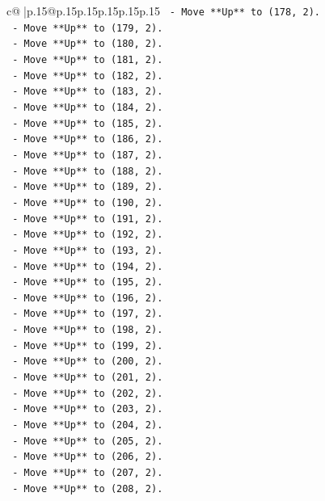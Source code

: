 \documentclass{article}
\begin{document}
{\begin{supertabular}{c@{$\;$}|p{.15\linewidth}@{}p{.15\linewidth}p{.15\linewidth}p{.15\linewidth}p{.15\linewidth}p{.15\linewidth}}
{{{\texttt{    {-} Move **Up** to (178, 2).} \\
\texttt{    {-} Move **Up** to (179, 2).} \\
\texttt{    {-} Move **Up** to (180, 2).} \\
\texttt{    {-} Move **Up** to (181, 2).} \\
\texttt{    {-} Move **Up** to (182, 2).} \\
\texttt{    {-} Move **Up** to (183, 2).} \\
\texttt{    {-} Move **Up** to (184, 2).} \\
\texttt{    {-} Move **Up** to (185, 2).} \\
\texttt{    {-} Move **Up** to (186, 2).} \\
\texttt{    {-} Move **Up** to (187, 2).} \\
\texttt{    {-} Move **Up** to (188, 2).} \\
\texttt{    {-} Move **Up** to (189, 2).} \\
\texttt{    {-} Move **Up** to (190, 2).} \\
\texttt{    {-} Move **Up** to (191, 2).} \\
\texttt{    {-} Move **Up** to (192, 2).} \\
\texttt{    {-} Move **Up** to (193, 2).} \\
\texttt{    {-} Move **Up** to (194, 2).} \\
\texttt{    {-} Move **Up** to (195, 2).} \\
\texttt{    {-} Move **Up** to (196, 2).} \\
\texttt{    {-} Move **Up** to (197, 2).} \\
\texttt{    {-} Move **Up** to (198, 2).} \\
\texttt{    {-} Move **Up** to (199, 2).} \\
\texttt{    {-} Move **Up** to (200, 2).} \\
\texttt{    {-} Move **Up** to (201, 2).} \\
\texttt{    {-} Move **Up** to (202, 2).} \\
\texttt{    {-} Move **Up** to (203, 2).} \\
\texttt{    {-} Move **Up** to (204, 2).} \\
\texttt{    {-} Move **Up** to (205, 2).} \\
\texttt{    {-} Move **Up** to (206, 2).} \\
\texttt{    {-} Move **Up** to (207, 2).} \\
\texttt{    {-} Move **Up** to (208, 2).} \\
}}}
\end{supertabular}}
\end{document}
